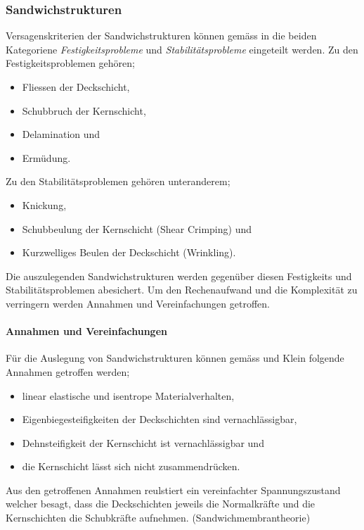   \subsubsection{Sandwichstrukturen}
  Versagenskriterien der Sandwichstrukturen können gemäss \cite{ETH} in die beiden Kategoriene \emph{Festigkeitsprobleme} und \emph{Stabilitätsprobleme} eingeteilt werden. Zu den Festigkeitsproblemen gehören;
  \begin{itemize}
    \item Fliessen der Deckschicht,
    \item Schubbruch der Kernschicht,
    \item Delamination und
    \item Ermüdung.
  \end{itemize}

  Zu den Stabilitätsproblemen gehören unteranderem;
  \begin{itemize}
    \item Knickung,
    \item Schubbeulung der Kernschicht (Shear Crimping) und
    \item Kurzwelliges Beulen der Deckschicht (Wrinkling).
  \end{itemize}

  Die auszulegenden Sandwichstrukturen werden gegenüber diesen Festigkeits und Stabilitätsproblemen abesichert. Um den Rechenaufwand und die Komplexität zu verringern werden Annahmen und Vereinfachungen getroffen.

    \paragraph{Annahmen und Vereinfachungen}
    Für die Auslegung von Sandwichstrukturen können gemäss \cite{ETH} und Klein \cite{klein} folgende Annahmen getroffen werden;
    \begin{itemize}
      \item linear elastische und isentrope Materialverhalten,
      \item Eigenbiegesteifigkeiten der Deckschichten sind vernachlässigbar,
      \item Dehnsteifigkeit der Kernschicht ist vernachlässigbar und
      \item die Kernschicht lässt sich nicht zusammendrücken.
    \end{itemize}

    Aus den getroffenen Annahmen reulstiert ein vereinfachter Spannungszustand welcher besagt, dass die Deckschichten jeweils die Normalkräfte und die Kernschichten die Schubkräfte aufnehmen. (Sandwichmembrantheorie)

